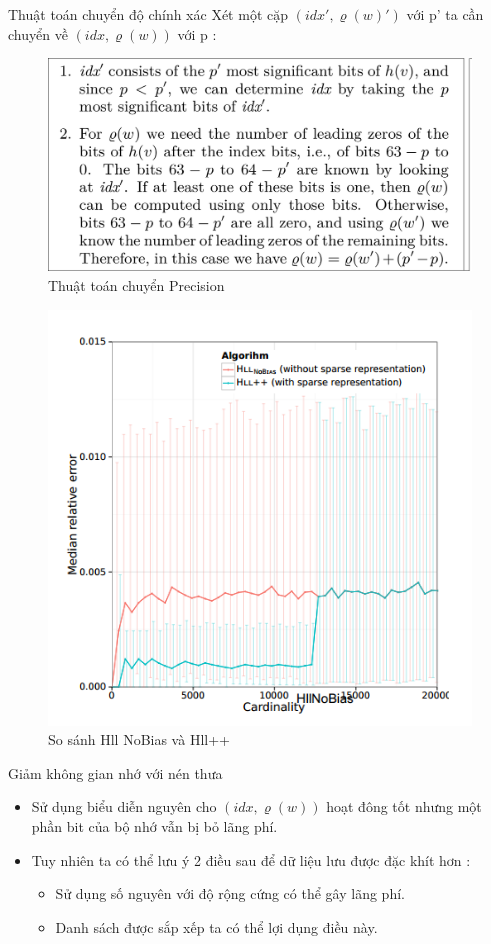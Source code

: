 \documentclass{beamer}
\newcommand{\bi}{\begin{itemize}}
\newcommand{\ei}{\end{itemize}}
\begin{document}
\begin{frame}{Thuật toán chuyển độ chính xác}
Xét một cặp $(idx',\varrho(w)') $ với p' ta cần chuyển về $(idx,\varrho(w)) $ với p : 
\begin{figure}[H]
\includegraphics[scale=0.2]{HSR.png}
\caption {Thuật toán chuyển Precision}
\end{figure}

\end{frame}
\begin{frame}
\begin{figure}
\includegraphics[scale=0.5]{img4.png}
\caption{So sánh Hll NoBias và  Hll++}
\end{figure}
\end{frame}
\begin{frame}{Giảm không gian nhớ với nén thưa }
\bi
\item Sử dụng biểu diễn nguyên cho $(idx,\varrho(w)) $ hoạt đông tốt nhưng một phần bit của bộ nhớ vẫn bị bỏ lãng phí.
\item Tuy nhiên ta có thể lưu ý 2 điều sau để dữ liệu lưu được đặc khít hơn :
\begin{itemize}
\item Sử dụng số nguyên với độ rộng cứng có thể gây lãng phí.
\item Danh sách được sắp xếp ta có thể lợi dụng điều này.
\end{itemize}
\ei 
\end{frame}
\end{document}
